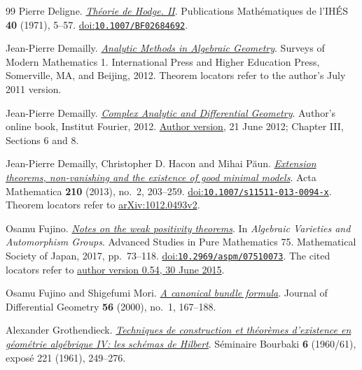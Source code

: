 \begin{thebibliography}{99}
Pierre Deligne.
\emph{\href{https://www.numdam.org/item/PMIHES_1971__40__5_0.pdf}{Th{\'e}orie de {Hodge}. {II}}}.
Publications Math{\'e}matiques de l'IH{\'E}S \textbf{40} (1971), 5--57.
\href{https://doi.org/10.1007/BF02684692}{doi:\nolinkurl{10.1007/BF02684692}}.

Jean-Pierre Demailly.
\emph{\href{https://www-fourier.univ-grenoble-alpes.fr/~demailly/manuscripts/analmeth_book.pdf}{Analytic Methods in Algebraic Geometry}}.
Surveys of Modern Mathematics 1.
International Press and Higher Education Press, Somerville, MA, and Beijing, 2012.
Theorem locators refer to the author's July 2011 version.

Jean-Pierre Demailly.
\emph{\href{https://www-fourier.univ-grenoble-alpes.fr/~demailly/manuscripts/agbook.pdf}{Complex Analytic and Differential Geometry}}.
Author's online book, Institut Fourier, 2012.
\href{https://www-fourier.univ-grenoble-alpes.fr/~demailly/manuscripts/agbook.pdf}{Author version}, 21 June 2012; Chapter III, Sections 6 and 8.

Jean-Pierre Demailly, Christopher D. Hacon and Mihai P{\u a}un.
\emph{\href{https://arxiv.org/abs/1012.0493v2}{Extension theorems, non-vanishing and the existence of good minimal models}}.
Acta Mathematica \textbf{210} (2013), no.~2, 203--259.
\href{https://doi.org/10.1007/s11511-013-0094-x}{doi:\nolinkurl{10.1007/s11511-013-0094-x}}.
Theorem locators refer to \href{https://arxiv.org/abs/1012.0493v2}{arXiv:1012.0493v2}.

Osamu Fujino.
\emph{\href{https://www.math.kyoto-u.ac.jp/~fujino/weak-posi11.pdf}{Notes on the weak positivity theorems}}.
In \emph{Algebraic Varieties and Automorphism Groups}.
Advanced Studies in Pure Mathematics 75.
Mathematical Society of Japan, 2017, pp.~73--118.
\href{https://doi.org/10.2969/aspm/07510073}{doi:\nolinkurl{10.2969/aspm/07510073}}.
The cited locators refer to \href{https://www.math.kyoto-u.ac.jp/~fujino/weak-posi11.pdf}{author version 0.54, 30 June 2015}.

Osamu Fujino and Shigefumi Mori.
\emph{\href{https://www.math.kyoto-u.ac.jp/~fujino/Canonical.pdf}{A canonical bundle formula}}.
Journal of Differential Geometry \textbf{56} (2000), no.~1, 167--188.

Alexander Grothendieck.
\emph{\href{https://www.numdam.org/item/SB_1960-1961__6__249_0.pdf}
{Techniques de construction et th\'eor\`emes d'existence en g\'eom\'etrie alg\'ebrique IV: les sch\'emas de Hilbert}}.
S\'eminaire Bourbaki \textbf{6} (1960/61), expos\'e 221 (1961), 249--276.


\end{thebibliography}
